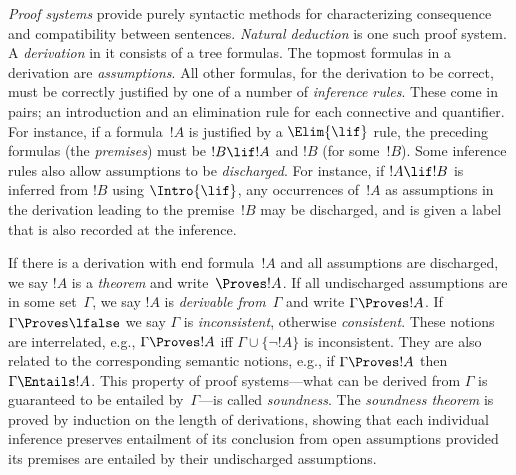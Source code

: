 \emph{Proof systems} provide purely syntactic methods for
characterizing consequence and compatibility between
sentences. \emph{Natural deduction} is one such proof
system. A \emph{derivation} in it consists of a tree formulas. The
topmost formulas in a derivation are \emph{assumptions}.  All other
formulas, for the derivation to be correct, must be correctly
justified by one of a number of \emph{inference rules}. These come in
pairs; an introduction and an elimination rule for each connective and
quantifier. For instance, if a formula~$!A$ is justified by a
$\Elim{\lif}$ rule, the preceding formulas (the \emph{premises}) must
be $!B \lif !A$ and $!B$ (for some~$!B$). Some inference rules also
allow assumptions to be \emph{discharged}. For instance, if $!A \lif
!B$ is inferred from $!B$ using $\Intro{\lif}$, any occurrences
of~$!A$ as assumptions in the derivation leading to the premise~$!B$
may be discharged, and is given a label that is also recorded at the
inference.

If there is a derivation with end formula~$!A$ and all assumptions are
discharged, we say $!A$ is a \emph{theorem} and write~$\Proves !A$. If
all undischarged assumptions are in some set~$\Gamma$, we say $!A$ is
\emph{derivable from}~$\Gamma$ and write $\Gamma \Proves !A$. If
$\Gamma \Proves \lfalse$ we say $\Gamma$ is \emph{inconsistent}, otherwise
\emph{consistent}. These notions are interrelated, e.g., $\Gamma
\Proves !A$ iff $\Gamma \cup \{\lnot !A\}$ is inconsistent. They are
also related to the corresponding semantic notions, e.g., if $\Gamma
\Proves !A$ then $\Gamma \Entails !A$. This property of proof
systems---what can be derived from $\Gamma$ is guaranteed to be
entailed by~$\Gamma$---is called \emph{soundness}. The \emph{soundness
theorem} is proved by induction on the length of derivations, showing
that each individual inference preserves entailment of its conclusion
from open assumptions provided its premises are entailed by their undischarged
assumptions.
